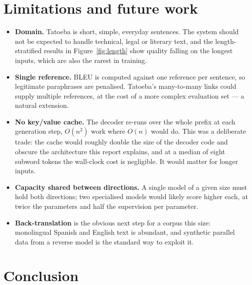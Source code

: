 \documentclass[11pt,a4paper]{article}
\begin{document}

\section{Limitations and future work}

\begin{itemize}
  \item \textbf{Domain.} Tatoeba is short, simple, everyday sentences. The
    system should not be expected to handle technical, legal or literary text,
    and the length-stratified results in Figure~\ref{fig:length} show quality
    falling on the longest inputs, which are also the rarest in training.
  \item \textbf{Single reference.} BLEU is computed against one reference per
    sentence, so legitimate paraphrases are penalised. Tatoeba's many-to-many
    links could supply multiple references, at the cost of a more complex
    evaluation set --- a natural extension.
  \item \textbf{No key/value cache.} The decoder re-runs over the whole prefix
    at each generation step, $O(n^2)$ work where $O(n)$ would do. This was a
    deliberate trade: the cache would roughly double the size of the decoder
    code and obscure the architecture this report explains, and at a median of
    eight subword tokens the wall-clock cost is negligible. It would matter for
    longer inputs.
  \item \textbf{Capacity shared between directions.} A single model of a given
    size must hold both directions; two specialised models would likely score
    higher each, at twice the parameters and half the supervision per
    parameter.
  \item \textbf{Back-translation} is the obvious next step for a corpus this
    size: monolingual Spanish and English text is abundant, and synthetic
    parallel data from a reverse model is the standard way to exploit it.
\end{itemize}

\section{Conclusion}
\end{document}
